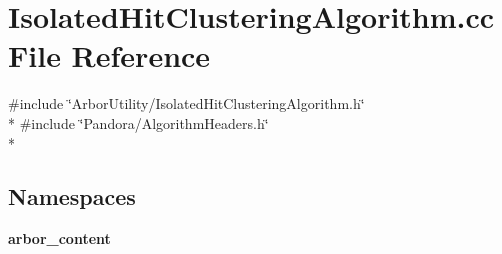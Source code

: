 \section{Isolated\+Hit\+Clustering\+Algorithm.\+cc File Reference}
\label{IsolatedHitClusteringAlgorithm_8cc}
{\ttfamily \#include \char`\"{}Arbor\+Utility/\+Isolated\+Hit\+Clustering\+Algorithm.\+h\char`\"{}}\\*
{\ttfamily \#include \char`\"{}Pandora/\+Algorithm\+Headers.\+h\char`\"{}}\\*
\subsection*{Namespaces}
\begin{DoxyCompactItemize}
\item 
 {\bf arbor\+\_\+content}
\end{DoxyCompactItemize}
